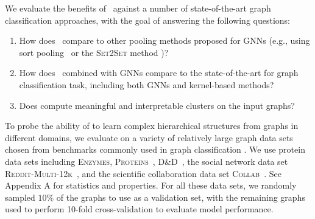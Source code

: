 We evaluate the benefits of \name\ against a number of state-of-the-art graph classification approaches, with the goal of answering the following questions:
\begin{enumerate}[leftmargin=20pt]
\item[{\bf Q1}] How does  \name\ compare to other pooling methods proposed for GNNs (e.g., using sort pooling~\cite{zhang2018end} or the \textsc{Set2Set} method \cite{Gil+2017})?
\item[{\bf Q2}] How does  \name\ combined with GNNs compare to the state-of-the-art for graph classification task, including both GNNs and kernel-based methods?
\item[{\bf Q3}] Does  \name  compute meaningful and interpretable clusters on the input graphs?
\end{enumerate}


To probe the ability of \name to learn complex hierarchical structures from graphs in different domains, we evaluate on a variety of relatively large graph data sets chosen from benchmarks commonly used in graph classification \cite{KKMMN2016}. We use protein data sets including \textsc{Enzymes}, \textsc{Proteins}~\cite{Borgwardt2005a, Fer+2013}, \textsc{D\&D}~\cite{Dob+2003}, the social network data set \textsc{Reddit-Multi-12k}~\cite{Yan+2015a}, and the scientific collaboration data set \textsc{Collab}~\cite{Yan+2015a}. See Appendix A for statistics and properties.
For all these data sets, we randomly sampled $10\%$ of the graphs to use as a validation set, with the remaining graphs used to perform 10-fold cross-validation to evaluate model performance. 
 

